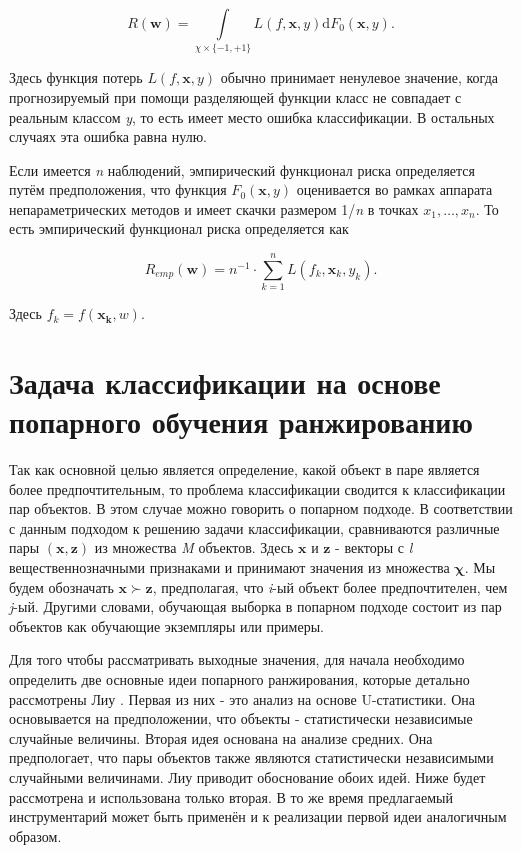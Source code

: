 \documentclass[12pt,a4paper,oneside]{article}
\begin{document}
\begin{multicols}{2}
\[
R(\mathbf{w}) = \int \limits_{\chi \times \{-1, +1\}} L(f, \mathbf{x}, y) \mathrm{d} F_0(\mathbf{x}, y).
\]

Здесь функция потерь \(L(f, \mathbf{x}, y)\) обычно принимает ненулевое значение, когда прогнозируемый при помощи разделяющей функции класс не совпадает с реальным классом \emph{y}, то есть имеет место ошибка классификации. 
В остальных случаях эта ошибка равна нулю. 

\par
Если имеется \emph{n} наблюдений, эмпирический функционал риска определяется путём предположения, что функция \(F_0(\mathbf{x}, y)\) оценивается во рамках аппарата непараметрических методов  и имеет скачки размером 1/\emph{n} в точках \(x_1, \dots, x_n\). 
То есть эмпирический функционал риска определяется как

\[
R_{emp}(\mathbf{w}) = n^{-1} \cdot \sum \limits_{k=1}^n L(f_k, \mathbf{x}_k, y_k).
\]

Здесь \(f_k=f(\mathbf{x_k}, w)\). 


\vspace*{1em}
\chapter{Задача классификации на основе попарного обучения ранжированию}

\par
Так как основной целью является определение, какой объект в паре является более предпочтительным, то проблема классификации сводится к классификации пар объектов. 
В этом случае можно говорить о попарном подходе. 
В соответствии с данным подходом к решению задачи классификации, сравниваются различные пары \((\mathbf{x},\mathbf{z})\) из множества \emph{M} объектов. 
Здесь \(\mathbf{x}\) и \(\mathbf{z}\) - векторы с \emph{l} вещественнозначными признаками и принимают значения из множества \(\mathbf{\chi}\). 
Мы будем обозначать \(\mathbf{x} \succ \mathbf{z}\), предполагая, что \emph{i}-ый объект более предпочтителен, чем \emph{j}-ый. 
Другими словами, обучающая выборка в попарном подходе состоит из пар объектов как обучающие экземпляры или примеры. 

\par
Для того чтобы рассматривать выходные значения, для начала необходимо определить две основные идеи попарного ранжирования, которые детально рассмотрены Лиу .
Первая из них - это анализ на основе U-статистики.
Она основывается на предположении, что объекты - статистически независимые случайные величины.
Вторая идея основана на анализе средних. 
Она предпологает, что пары объектов также являются статистически независимыми случайными величинами. 
Лиу приводит обоснование обоих идей. 
Ниже будет рассмотрена и использована только вторая. 
В то же время предлагаемый инструментарий может быть применён и к реализации первой идеи аналогичным образом. 


\end{multicols}
\end{document}
